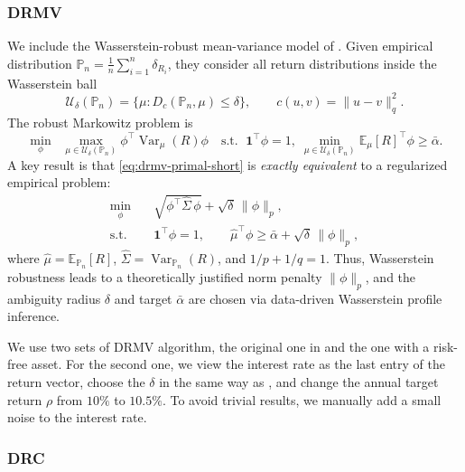 \documentclass[11pt]{article}
\theoremstyle{definition}
\begin{document}
\subsubsection{DRMV} \label{drmv_detail}
We include the Wasserstein-robust mean-variance model of \cite{BlanchetChenZhou2021}.
Given empirical distribution 
\(\mathbb{P}_n = \frac1n \sum_{i=1}^n \delta_{R_i}\),
they consider all return distributions inside the Wasserstein ball
\[
\mathcal{U}_\delta(\mathbb{P}_n)
= \{\mu : D_c(\mathbb{P}_n, {\mu})\le \delta \}, 
\qquad 
c(u,v)=\|u-v\|_q^2.
\]
The robust Markowitz problem is
\begin{equation}
\min_{\phi}\;\; \max_{{\mu}\in \mathcal{U}_\delta(\mathbb{P}_n)} 
\phi^\top \operatorname{Var}_{{\mu}}(R)\phi
\quad 
\text{s.t. }\;
\mathbf{1}^\top\phi=1,\;
\min_{{\mu} \in\mathcal{U}_\delta(\mathbb{P}_n)} \mathbb{E}_{\mu}[R]^\top\phi \ge \bar\alpha.
\label{eq:drmv-primal-short}
\end{equation}
A key result is that \eqref{eq:drmv-primal-short} is \emph{exactly equivalent} to a regularized empirical problem:
\begin{equation}
\begin{aligned}
\min_{\phi}\quad &
\sqrt{\phi^\top \hat\Sigma\,\phi} + \sqrt{\delta}\,\|\phi\|_p,\\
\text{s.t.}\quad &
\mathbf{1}^\top\phi = 1,\qquad
\hat\mu^\top\phi \ge \bar\alpha + \sqrt{\delta}\,\|\phi\|_p,
\end{aligned}
\label{eq:drmv-regularized-short}
\end{equation}
where \(\hat\mu=\mathbb{E}_{\mathbb{P}_n}[R]\), \(\hat\Sigma=\operatorname{Var}_{\mathbb{P}_n}(R)\), and \(1/p+1/q=1\). 
Thus, Wasserstein robustness leads to a theoretically justified norm penalty \(\|\phi\|_p\), and the ambiguity radius \(\delta\) and target \(\bar\alpha\) are chosen via data-driven Wasserstein profile inference.

We use two sets of DRMV algorithm, the original one in \cite{BlanchetChenZhou2021} and the one with a risk-free asset. For the second one, we view the interest rate as the last entry of the return vector, choose the $\delta$ in the same way as \cite{BlanchetChenZhou2021}, and change the annual target return $\rho$ from $10 \%$ to $10.5 \%$. To avoid trivial results, we manually add a small noise to the interest rate.

\subsubsection{DRC}\label{drc_detail}
\end{document}
